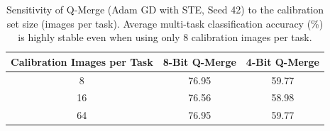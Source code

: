 \begin{table}[t]
\caption{Sensitivity of Q-Merge (Adam GD with STE, Seed 42) to the calibration set size (images per task). Average multi-task classification accuracy (\%) is highly stable even when using only 8 calibration images per task.}
\label{tab:sensitivity_results}
\vskip 0.15in
\begin{center}
\begin{small}
\begin{sc}
\begin{tabular}{ccc}
\toprule
Calibration Images per Task & 8-Bit Q-Merge & 4-Bit Q-Merge \\
\midrule
8  & 76.95 & 59.77 \\
16 & 76.56 & 58.98 \\
64 & 76.95 & 59.77 \\
\bottomrule
\end{tabular}
\end{sc}
\end{small}
\end{center}
\vskip -0.1in
\end{table}
